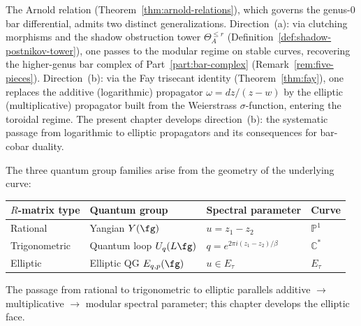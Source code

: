 \begin{remark}
\label{rem:arnold-fay-generalization}
The Arnold relation (Theorem~\ref{thm:arnold-relations}), which governs the genus-$0$ bar differential, admits two distinct generalizations. Direction~(a): via clutching morphisms and the shadow obstruction tower $\Theta_A^{\leq r}$ (Definition~\ref{def:shadow-postnikov-tower}), one passes to the modular regime on stable curves, recovering the higher-genus bar complex of Part~\ref{part:bar-complex} (Remark~\ref{rem:five-pieces}). Direction~(b): via the Fay trisecant identity (Theorem~\ref{thm:fay}), one replaces the additive (logarithmic) propagator $\omega = dz/(z-w)$ by the elliptic (multiplicative) propagator built from the Weierstrass $\sigma$-function, entering the toroidal regime. The present chapter develops direction~(b): the systematic passage from logarithmic to elliptic propagators and its consequences for bar-cobar duality.
\end{remark}

\begin{remark}
\label{rem:rational-trig-elliptic}
The three quantum group families arise from the geometry of the underlying curve:
\begin{center}
\small
\begin{tabular}{llll}
\textbf{$R$-matrix type} & \textbf{Quantum group} &
 \textbf{Spectral parameter} & \textbf{Curve} \\ \hline
Rational
 & Yangian $Y(\fg)$
 & $u = z_1 - z_2$
 & $\mathbb{P}^1$ \\[2pt]
Trigonometric
 & Quantum loop $U_q(L\fg)$
 & $q = e^{2\pi i(z_1 - z_2)/\beta}$
 & $\mathbb{C}^*$ \\[2pt]
Elliptic
 & Elliptic QG $E_{q,p}(\fg)$
 & $u \in E_\tau$
 & $E_\tau$
\end{tabular}
\end{center}
The passage from rational to trigonometric to elliptic parallels additive $\to$ multiplicative $\to$ modular spectral parameter; this chapter develops the elliptic face.
\end{remark}

